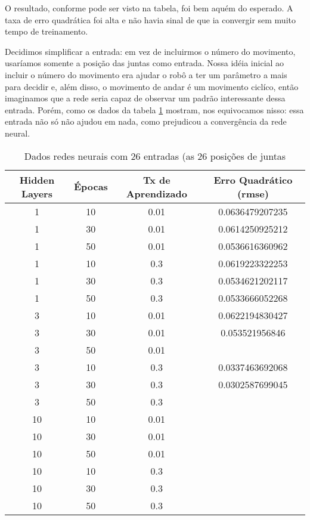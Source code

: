 \documentclass[twoside,conference,a4paper]{IEEEtran}
\begin{document}
 O resultado, conforme pode ser visto na tabela, foi bem aquém do esperado. A taxa de erro quadrática foi alta e não havia sinal de que ia convergir sem muito tempo de treinamento.
 
Decidimos simplificar a entrada: em vez de incluirmos o número do movimento, usaríamos somente a posição das juntas como entrada. Nossa idéia inicial ao incluir o número do movimento era ajudar o robô a ter um parâmetro a mais para decidir e, além disso, o movimento de andar é um movimento ciclíco, então imaginamos que a rede seria capaz de observar um padrão interessante dessa entrada. Porém, como os dados da tabela \ref{redes_neurais_tabela_2} mostram, nos equivocamos nisso: essa entrada não só não ajudou em nada, como prejudicou a convergência da rede neural.

 \begin{table}[h]
\caption{Dados redes neurais com 26 entradas (as 26 posições de juntas}
 \label{redes_neurais_tabela_2}
 \begin{center}
 \begin{tabular}{|c|c|c|c|}
 \hline
 Hidden Layers & Épocas & Tx de Aprendizado & Erro Quadrático (rmse) \\
 \hline
 1 & 10 & 0.01 & 0.0636479207235 \\
 1 & 30 & 0.01 & 0.0614250925212 \\
 1 & 50 & 0.01 & 0.0536616360962 \\
 1 & 10 & 0.3 & 0.0619223322253 \\  
 1 & 30 & 0.3 & 0.0534621202117 \\  
 1 & 50 & 0.3 & 0.0533666052268 \\
 3 & 10 &  0.01 & 0.0622194830427\\
 3 &  30 & 0.01 & 0.053521956846 \\ 
 3 &  50 & 0.01 & \\
 3 & 10 &  0.3 & 0.0337463692068 \\
 3 &  30 & 0.3 & 0.0302587699045 \\
 3 &  50 & 0.3 &  \\
 10 & 10 & 0.01 & \\
10 &  30 & 0.01 &  \\
10 &  50 & 0.01 & \\
10 & 10 & 0.3  &  \\
10 &  30 & 0.3 & \\
10 &  50 & 0.3 & \\
 \hline
 \end{tabular}
 \end{center}
 \end{table}  
 
\end{document}
